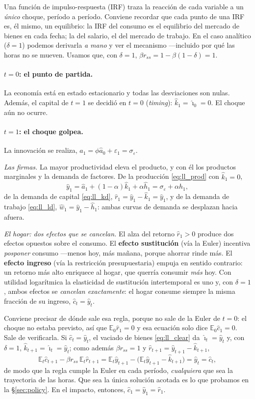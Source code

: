 \documentclass[11pt,a4paper]{report}
\newcommand{\E}{\mathbb{E}}
\begin{document}
Una función de impulso-respuesta (IRF) traza la reacción de cada variable a un
\emph{único} choque, período a período. Conviene recordar que cada punto de una IRF es,
él mismo, un equilibrio: la IRF del consumo es el equilibrio del mercado de bienes en
cada fecha; la del salario, el del mercado de trabajo. En el caso analítico ($\delta=1$)
podemos derivarla \emph{a mano} y ver el mecanismo ---incluido por qué las horas no se
mueven. Usamos que, con $\delta=1$, $\beta r_{ss}=1-\beta(1-\delta)=1$.

\paragraph{$t=0$: el punto de partida.} La economía está en estado estacionario y
todas las desviaciones son nulas. Además, el capital de $t=1$ se decidió en $t=0$
(\emph{timing}): $\hat{k}_1=\hat{\imath}_0=0$. El choque aún no ocurre.

\paragraph{$t=1$: el choque golpea.} La innovación se realiza,
$\hat{a}_1=\phi\hat{a}_0+\varepsilon_1=\sigma_\varepsilon$.

\emph{Las firmas.} La mayor productividad eleva el producto, y con él los productos
marginales y la demanda de factores. De la producción \eqref{eq:ll_prod} con
$\hat{k}_1=0$,
\[
\hat{y}_1=\hat{a}_1+(1-\alpha)\hat{k}_1+\alpha\hat{h}_1=\sigma_\varepsilon+\alpha\hat{h}_1,
\]
de la demanda de capital \eqref{eq:ll_kd}, $\hat{r}_1=\hat{y}_1-\hat{k}_1=\hat{y}_1$, y
de la demanda de trabajo \eqref{eq:ll_ld}, $\hat{w}_1=\hat{y}_1-\hat{h}_1$: ambas curvas
de demanda se desplazan hacia afuera.

\emph{El hogar: dos efectos que se cancelan.} El alza del retorno $\hat{r}_1>0$ produce
dos efectos opuestos sobre el consumo. El \textbf{efecto sustitución} (vía la Euler)
incentiva \emph{posponer} consumo ---menos hoy, más mañana, porque ahorrar rinde más.
El \textbf{efecto ingreso} (vía la restricción presupuestaria) empuja en sentido
contrario: un retorno más alto enriquece al hogar, que querría consumir \emph{más} hoy.
Con utilidad logarítmica la elasticidad de sustitución intertemporal es uno y, con
$\delta=1$, ambos efectos se \emph{cancelan exactamente}: el hogar consume siempre la
misma fracción de su ingreso, $\hat{c}_t=\hat{y}_t$.

Conviene precisar de dónde sale esa regla, porque no sale de la Euler de $t=0$: el
choque no estaba previsto, así que $\E_0\hat{r}_1=0$ y esa ecuación solo dice
$\E_0\hat{c}_1=0$. Sale de verificarla. Si $\hat{c}_t=\hat{y}_t$, el vaciado de bienes
\eqref{eq:ll_clear} da $\hat{\imath}_t=\hat{y}_t$ y, con $\delta=1$,
$\hat{k}_{t+1}=\hat{\imath}_t=\hat{y}_t$; como además $\beta r_{ss}=1$ y
$\hat{r}_{t+1}=\hat{y}_{t+1}-\hat{k}_{t+1}$,
\[
\E_t\hat{c}_{t+1}-\beta r_{ss}\,\E_t\hat{r}_{t+1}
=\E_t\hat{y}_{t+1}-\big(\E_t\hat{y}_{t+1}-\hat{k}_{t+1}\big)
=\hat{y}_t=\hat{c}_t ,
\]
de modo que la regla cumple la Euler en cada período, \emph{cualquiera} que sea la
trayectoria de las horas. Que sea la única solución acotada es lo que probamos en la
\S\ref{sec:policy}. En el impacto, entonces, $\hat{c}_1=\hat{y}_1=\hat{r}_1$.
\end{document}
